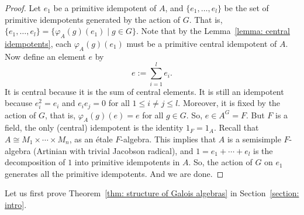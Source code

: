 \documentclass[12pt,a4paper]{amsart}
\numberwithin{equation}{section}%
\theoremstyle{plain}%
\theoremstyle{definition}%
\theoremstyle{remark}%
\begin{document}
	\begin{proof}
		Let $e_1$ be a primitive idempotent of $A$, and $\{e_1,\dots,e_l\}$ be the set of primitive idempotents generated by the action of $G$.
		That is, $\{e_1,\dots,e_l\}=\{\varphi_A(g)(e_1)\mid g\in G\}$.
		Note that by the Lemma~\ref{lemma: central idempotents}, each $\varphi_A(g)(e_1)$ must be a primitive central idempotent of $A$.
		Now define an element $e$ by
		\begin{equation*}
			e:=\sum_{i=1}^l e_i.
		\end{equation*}
		It is central because it is the sum of central elements.
		It is still an idempotent because $e_i^2=e_i$ and $e_ie_j=0$ for all $1\leq i\neq j\leq l$.
		Moreover, it is fixed by the action of $G$, that is, $\varphi_A(g)(e)=e$ for all $g\in G$.
		So, $e\in A^G=F$.
		But $F$ is a field, the only (central) idempotent is the identity $1_F=1_A$.
		Recall that $A\cong M_1\times\cdots\times M_n$, as an {\'e}tale $F$-algebra.
		This implies that $A$ is a semisimple $F$-algebra (Artinian with trivial Jacobson radical), and $1=e_1+\cdots+e_l$ is the decomposition of $1$ into primitive idempotents in $A$.
		So, the action of $G$ on $e_1$ generates all the primitive idempotents.
		And we are done.
	\end{proof}
	Let us first prove Theorem~\ref{thm: structure of Galois algebras} in Section~\ref{section: intro}.
\end{document}
